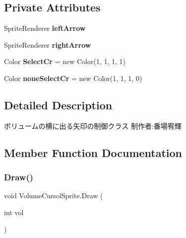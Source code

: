 \subsection*{Private Attributes}
\begin{DoxyCompactItemize}
\item 
\mbox{\label{class_volume_cursol_sprite_ae00168e2002937852bcf303b6f590d50}} 
Sprite\+Renderer {\bfseries left\+Arrow}
\item 
\mbox{\label{class_volume_cursol_sprite_a6c014ade95c853da217b099559ca3f3e}} 
Sprite\+Renderer {\bfseries right\+Arrow}
\item 
\mbox{\label{class_volume_cursol_sprite_a217dd20d88deb4b765a316b9e404f556}} 
Color {\bfseries Select\+Cr} = new Color(1, 1, 1, 1)
\item 
\mbox{\label{class_volume_cursol_sprite_ae0a7db837cb1c22e3f7c5a7e803da8b7}} 
Color {\bfseries none\+Select\+Cr} = new Color(1, 1, 1, 0)
\end{DoxyCompactItemize}


\subsection{Detailed Description}
ボリュームの横に出る矢印の制御クラス 制作者\+:番場宥輝 



\subsection{Member Function Documentation}
\mbox{\label{class_volume_cursol_sprite_ab8436891aacf087e0e2f0edcd70baa55}} 
\subsubsection{\texorpdfstring{Draw()}{Draw()}}
{\footnotesize\ttfamily void Volume\+Cursol\+Sprite.\+Draw (\begin{DoxyParamCaption}\item[{int}]{vol }\end{DoxyParamCaption})\hspace{0.3cm}{\ttfamily [inline]}}



